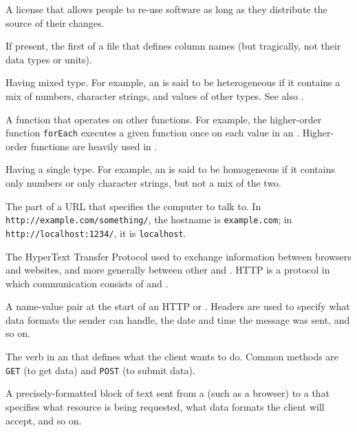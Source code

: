 \begin{description}
A license that allows people to re-use software as long as they distribute
the source of their changes.

If present, the first of a  file that defines column names (but
tragically, not their data types or units).

Having mixed type. For example, an  is said to be
heterogeneous if it contains a mix of numbers, character strings, and values
of other types. See also .

A function that operates on other functions. For example, the higher-order
function \texttt{forEach} executes a given function once on each value in an
.
Higher-order functions are heavily used in .

Having a single type. For example, an  is said to be
homogeneous if it contains only numbers or only character strings, but not a
mix of the two.

The part of a URL that specifies the computer to talk to. In
\texttt{http://example.com/something/}, the hostname is \texttt{example.com}; in
\texttt{http://localhost:1234/}, it is \texttt{localhost}.

The HyperText Transfer Protocol used to exchange information between browsers
and websites, and more generally between other  and
. HTTP is a  protocol in which
communication consists of  and
.

A name-value pair at the start of an HTTP  or
. Headers are used to specify what data formats
the sender can handle, the date and time the message was sent, and so on.

The verb in an  that defines what the client
wants to do. Common methods are \texttt{GET} (to get data) and \texttt{POST} (to submit
data).

A precisely-formatted block of text sent from a  (such as a
browser) to a  that specifies what resource is being
requested, what data formats the client will accept, and so on.


\end{description}
